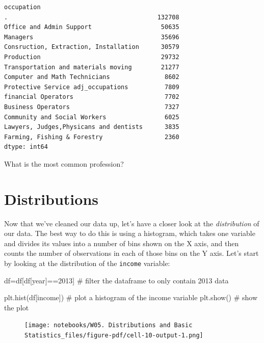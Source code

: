 \documentclass[
  letterpaper,
  DIV=11,
  numbers=noendperiod]{scrreprt}
\newenvironment{Shaded}{\begin{snugshade}}{\end{snugshade}}
\newcommand{\CommentTok}[1]{\textcolor[rgb]{0.37,0.37,0.37}{#1}}
\newcommand{\DecValTok}[1]{\textcolor[rgb]{0.68,0.00,0.00}{#1}}
\newcommand{\NormalTok}[1]{\textcolor[rgb]{0.00,0.23,0.31}{#1}}
\newcommand{\OperatorTok}[1]{\textcolor[rgb]{0.37,0.37,0.37}{#1}}
\newcommand{\StringTok}[1]{\textcolor[rgb]{0.13,0.47,0.30}{#1}}
\begin{document}
\begin{verbatim}
occupation
.                                         132708
Office and Admin Support                   50635
Managers                                   35696
Consruction, Extraction, Installation      30579
Production                                 29732
Transportation and materials moving        21277
Computer and Math Technicians               8602
Protective Service adj_occupations          7809
financial Operators                         7702
Business Operators                          7327
Community and Social Workers                6025
Lawyers, Judges,Physicans and dentists      3835
Farming, Fishing & Forestry                 2360
dtype: int64
\end{verbatim}

What is the most common profession?


\hypertarget{distributions}{%
\chapter{Distributions}\label{distributions}}

Now that we've cleaned our data up, let's have a closer look at the
\emph{distribution} of our data. The best way to do this is using a
histogram, which takes one variable and divides its values into a number
of bins shown on the X axis, and then counts the number of observations
in each of those bins on the Y axis. Let's start by looking at the
distribution of the \texttt{income} variable:

\begin{Shaded}
\begin{Highlighting}[]
\NormalTok{df}\OperatorTok{=}\NormalTok{df[df[}\StringTok{\textquotesingle{}year\textquotesingle{}}\NormalTok{]}\OperatorTok{==}\DecValTok{2013}\NormalTok{] }\CommentTok{\# filter the dataframe to only contain 2013 data}

\NormalTok{plt.hist(df[}\StringTok{\textquotesingle{}income\textquotesingle{}}\NormalTok{]) }\CommentTok{\# plot a histogram of the income variable}
\NormalTok{plt.show() }\CommentTok{\# show the plot}
\end{Highlighting}
\end{Shaded}

\begin{figure}[H]

{\centering \texttt{[image: notebooks/W05. Distributions and Basic Statistics\_files/figure-pdf/cell-10-output-1.png]}

}

\end{figure}
\end{document}
